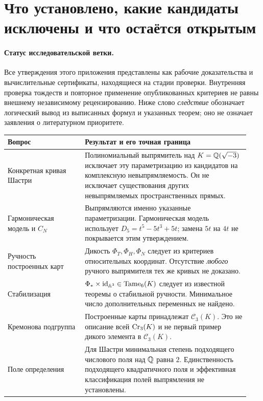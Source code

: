 \section{Что установлено, какие кандидаты исключены и что остаётся открытым}
\label{sec:status-literature}

\paragraph{Статус исследовательской ветки.}
Все утверждения этого приложения представлены как рабочие доказательства и
вычислительные сертификаты, находящиеся на стадии проверки. Внутренняя
проверка тождеств и повторное применение опубликованных критериев не равны
внешнему независимому рецензированию. Ниже слово \emph{следствие} обозначает
логический вывод из выписанных формул и указанных теорем; оно не означает
заявления о литературном приоритете.

\begin{center}
\small
\begin{tabular}{@{}p{0.30\linewidth}p{0.64\linewidth}@{}}
\toprule
Вопрос & Результат и его точная граница\\
\midrule
Конкретная кривая Шастри &
Полиномиальный выпрямитель над $K={\mathbb Q}(\sqrt{-3})$ исключает эту
параметризацию из кандидатов на комплексную невыпрямляемость. Он не
исключает существования других невыпрямляемых пространственных прямых.\\[4pt]
Гармоническая модель и $C_N$ &
Выпрямляются именно указанные параметризации. Гармоническая модель
использует $D_5=t^5-5t^3+5t$; замена $5t$ на $4t$ не покрывается
этим утверждением.\\[4pt]
Ручность построенных карт &
Дикость $\Phi_T,\Phi_H,\Phi_N$ следует из критериев относительных
координат. Отсутствие \emph{любого} ручного выпрямителя тех же кривых
не доказано.\\[4pt]
Стабилизация &
$\Phi_\ast\times\mathrm{id}_{{\mathbb A}^3}\in\operatorname{Tame}_6(K)$ следует из известной
теоремы о стабильной ручности. Минимальное число дополнительных
переменных не найдено.\\[4pt]
Кремонова подгруппа &
Построенные карты принадлежат $\mathcal C_3(K)$.
Это не описание всей $\operatorname{Cr}_3(K)$ и не первый пример дикого элемента
в $\mathcal C_3(K)$.\\[4pt]
Поле определения &
Для Шастри минимальная степень подходящего числового поля над ${\mathbb Q}$
равна $2$. Единственность подходящего квадратичного поля и эффективная
классификация полей выпрямления не установлены.\\
\bottomrule
\end{tabular}
\end{center}

